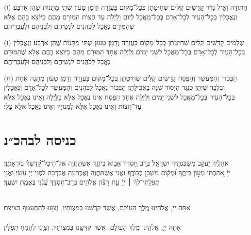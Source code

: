 \documentclass[twoside, openany, parskip=half, 11pt]{book}
\begin{document}
(ו) הַתּוֹדָה וְאֵיל נָזִיר קׇדָשִׁים קַלִּים׃ שְׁחִיטָתָן בְּכׇל־מָקוֹם בָּעֲזָרָה וְדָמָן טָעוּן שְׁתֵּי מַתָּנוֹת שֶׁהֵן אַרְבַּע׃ וְנֶאֱכָלִין בְּכׇל־הָעִיר לְכׇל־אָדָם בְּכׇל־מַאֲכָל לְיוֹם וָלַֽיְלָה עַד חֲצוֹת׃ הַמּוּרָם מֵהֶם כַּיּוֹצֵא בָהֶם אֶלָּא שֶׁהַמּוּרָם נֶאֱכָל לַכֹּהֲנִים לִנְשֵׁיהֶם וְלִבְנֵיהֶם וּלְעַבְדֵיהֶם׃

(ז) שְׁלָמִים קׇדָשִׁים קַלִּים׃ שְׁחִיטָתָן בְּכׇל־מָקוֹם בָּעֲזָרָה וְדָמָן טָעוּן שְׁתֵּי מַתָּנוֹת שֶׁהֵן אַרְבַּע׃ וְנֶאֱכָלִין בְּכׇל־הָעִיר לְכׇל־אָדָם בְּכׇל־מַאֲכָל לִשְׁנֵי יָמִים וְלַֽיְלָה אֶחָד׃ הַמּוּרָם מֵהֶם כַּיּוֹצֵא בָהֶם אֶלָּא שֶׁהַמּוּרָם נֶאֱכָל לַכֹּהֲנִים לִנְשֵׁיהֶם וְלִבְנֵיהֶם וּלְעַבְדֵיהֶם׃

(ח) הַבְּכוֹר וְהַמַּעֲשֵׂר וְהַפֶּֽסַח קׇדָשִׁים קַלִּים׃ שְׁחִיטָתָן בְּכׇל־מָקוֹם בָּעֲזָרָה וְדָמָן טָעוּן מַתָּנָה אֶחָת וּבִלְבָד שֶׁיִּתֵּן כְּנֶֽגֶד הַיְסוֹד שִׁנָּה בַאֲכִילָתָן׃ הַבְּכוֹר נֶאֱכָל לַכֹּהֲנִים וְהַמַּעֲשֵׂר לְכׇל־אָדָם׃ וְנֶּאֱכָלִין בְּכׇל־הָעִיר בְּכׇל־מַאֲכָל לִשְׁנֵי יָמִים וְלַֽיְלָה אֶחָד׃ הַפֶּֽסַח אֵינוֹ נֶאֱכָל אֶלָּא בַלַּֽיְלָה וְאֵינוֹ נֶאֱכָל אֶלָּא עַד־חֲצוֹת וְאֵינוֹ נֶאֱכָל אֶלָּא לִמְנוּיָיו וְאֵינוֹ נֶאֱכָל אֶלָּא צָלִי׃\\


\section[כניסה לבהכ״נ]{ כניסה לבהכ״נ }
אֹהָלֶ֖יךָ יַעֲקֹ֑ב מִשְׁכְּנֹתֶ֖יךָ יִשְׂרָאֵֽל׃
בְּרֹ֣ב חַ֭סְדְּךָ אָב֣וֹא בֵיתֶ֑ךָ אֶשְׁתַּחֲוֶ֥ה אֶל־הֵיכַל־קׇ֝דְשְׁךָ֗ בְּיִרְאָתֶֽךָ׃\\
יְיָ֗ אָ֭הַבְתִּי מְע֣וֹן בֵּיתֶ֑ךָ וּ֝מְק֗וֹם מִשְׁכַּ֥ן כְּבוֹדֶֽךָ׃
וַאֲנִי אֶשְׁתַּחֲוֶה וְאֶכְרָֽעָה אֶבְרְכָה לִפְנֵי־יְיָ עֹשִׂי׃
וַאֲנִ֤י
%
תְפִלָּֽתִי־לְךָ֨ ׀ יְיָ֡ עֵ֤ת רָצ֗וֹן אֱלֹהִ֥ים בְּרׇב־חַסְדֶּ֑ךָ עֲ֝נֵ֗נִי בֶּאֱמֶ֥ת יִשְׁעֶֽךָ׃

\\
אַתָּה יְיָ, אֱלֹהֵֽינוּ מֶֽלֶךְ הָעוֹלָם, אֲשֶׁר קִדְּשָֽׁנוּ בְּמִצְוֹתָיו, וְצִוָּֽנוּ לְהִתְעַטֵּף בַּצִּיצִת׃\\

\\
אַתָּה יְיָ, אֱלֹהֵֽינוּ מֶֽלֶךְ הָעוֺלָם, אֲשֶׁר קִדְּשָֽׁנוּ בְּמִצְוֹתָיו, וְצִוָֽנוּ לְהַנִּֽיחַ תְּפִלִּין׃
\end{document}
